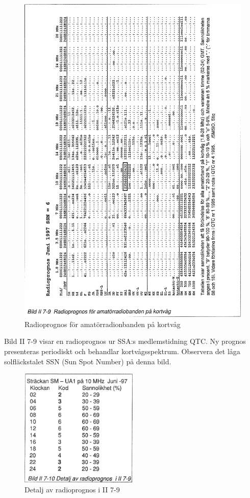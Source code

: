 \begin{figure}
  \includegraphics[width=\textwidth]{images/bild_2_7-09}
  \caption{Radioprognos för amatörradionbanden på kortvåg}
  \label{fig:bildII7-9}
\end{figure}

Bild II 7-9 visar en radioprognos ur SSA:s medlemstidning QTC. Ny
prognos presenteras periodiskt och behandlar
kortvågsspektrum. Observera det låga solfläckstalet SSN (Sun Spot
Number) på denna bild.

\begin{figure}
  \includegraphics[width=0.5\textwidth]{images/bild_2_7-10}
  \caption{Detalj av radioprognos i II 7-9}
  \label{fig:bildII7-10}
\end{figure}
